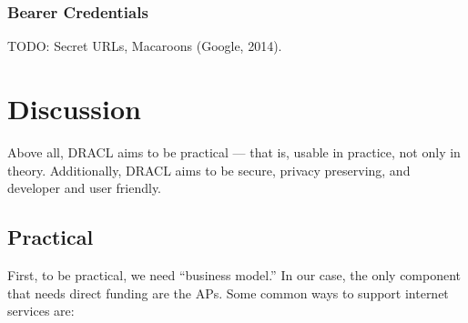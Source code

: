 \documentclass[pdftex,12pt,a4papaer]{report}
\begin{document}
\subsection{Bearer Credentials}

TODO: Secret URLs, Macaroons (Google, 2014).

\chapter{Discussion}

Above all, DRACL aims to be practical --- that is, usable in practice, not only
in theory. Additionally, DRACL aims to be secure, privacy preserving, and
developer and user friendly.

\section{Practical}

First, to be practical, we need ``business model.'' In our case, the only
component that needs direct funding are the APs. Some common ways to support
internet services are:
\end{document}
